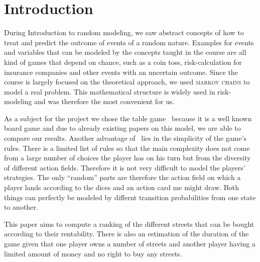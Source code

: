 \section{Introduction} %
\label{sec:introduction}

During Introduction to random modeling, we saw abstract concepts of how to treat and predict the 
outcome of events of a random nature. Examples for events and variables that can be modeled by the 
concepts taught in the course are all kind of games that depend on chance, such as a coin toss, 
risk-calculation for insurance companies and other events with an uncertain outcome. Since the course
is largely focused on the theoretical approach, we used \textsc{markov chains}	 to model 
a real problem. This mathematical structure is widely used in risk-modeling and was therefore the
most convenient for us. 

As a subject for the project we chose the table game \monopoly~because it is a well known board game and 
due to already existing papers on this model, we are able to compare our results. 
Another advantage of \monopoly~lies in the simplicity of the game's rules. 
There is a limited list of rules so that the main complexity does not come from a large number 
of choices the player has on his turn but from the diversity of different action fields. Therefore it is not
very difficult to model the players' strategies. 
The only ``random'' parts are therefore the action field on which a player lands according to the dices
and an action card me might draw. 
Both things can perfectly be modeled by differnt transition probabilities from one state to another.

This paper aims to compute a ranking of the different streets that can be bought according to their rentability. 
There is also an estimation of the duration of the game given that one player owns a number
of streets and another player having a limited amount of money and no right to buy any streets.

